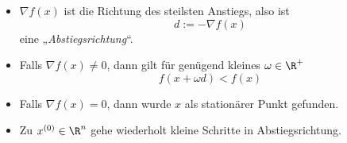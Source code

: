 \documentclass[11pt]{scrbook}
\begin{document}
\begin{seg}
	\begin{itemize}
		\item
			$\nabla f(x)$ ist die Richtung des steilsten Anstiegs, also ist
			\[
				d := -\nabla f(x)
			\]
			eine „\emph{Abstiegsrichtung}“.
		\item
			Falls $\nabla f(x) \neq 0$, dann gilt für genügend kleines $\omega \in \R^+$
			\[
				f(x + \omega d) < f(x)
			\]
		\item
			Falls $\nabla f(x) = 0$, dann wurde $x$ als stationärer Punkt gefunden.
		\item
			Zu $x^{(0)} \in \R^n$ gehe wiederholt kleine Schritte in Abstiegsrichtung.
	\end{itemize}
\end{seg}
\end{document}
